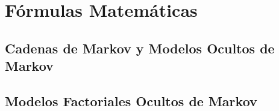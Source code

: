 \chapter{Fórmulas Matemáticas}
\section{Cadenas de Markov y Modelos Ocultos de Markov}
\section{Modelos Factoriales Ocultos de Markov}
